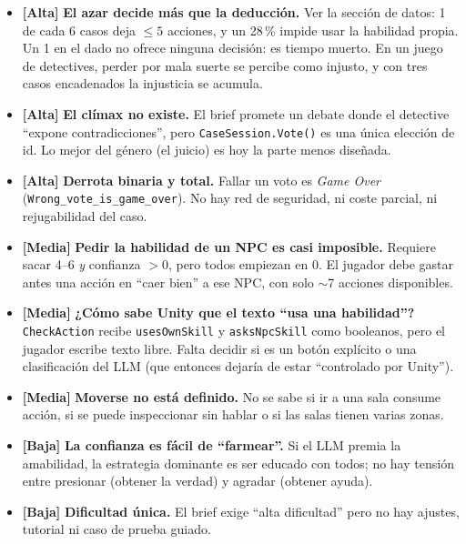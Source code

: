 \documentclass[11pt,a4paper]{article}
\newcommand{\file}[1]{\texttt{\small #1}}
\newcommand{\prio}[1]{\textbf{\color{neon}[#1]}}
\begin{document}
\begin{debil}
\begin{itemize}
\item \prio{Alta} \textbf{El azar decide más que la deducción.} Ver la sección de datos: 1 de cada 6
casos deja $\leq 5$ acciones, y un 28\,\% impide usar la habilidad propia. Un 1 en el dado no ofrece
ninguna decisión: es tiempo muerto. En un juego de detectives, perder por mala suerte se percibe como
injusto, y con tres casos encadenados la injusticia se acumula.
\item \prio{Alta} \textbf{El clímax no existe.} El brief promete un debate donde el detective
``expone contradicciones'', pero \file{CaseSession.Vote()} es una única elección de id. Lo mejor del
género (el juicio) es hoy la parte menos diseñada.
\item \prio{Alta} \textbf{Derrota binaria y total.} Fallar un voto es \emph{Game Over}
(\file{Wrong\_vote\_is\_game\_over}). No hay red de seguridad, ni coste parcial, ni rejugabilidad
del caso.
\item \prio{Media} \textbf{Pedir la habilidad de un NPC es casi imposible.} Requiere sacar 4--6
\emph{y} confianza $>0$, pero todos empiezan en 0. El jugador debe gastar antes una acción en
``caer bien'' a ese NPC, con solo $\sim$7 acciones disponibles.
\item \prio{Media} \textbf{¿Cómo sabe Unity que el texto ``usa una habilidad''?} \file{CheckAction}
recibe \texttt{usesOwnSkill} y \texttt{asksNpcSkill} como booleanos, pero el jugador escribe texto
libre. Falta decidir si es un botón explícito o una clasificación del LLM (que entonces dejaría de
estar ``controlado por Unity'').
\item \prio{Media} \textbf{Moverse no está definido.} No se sabe si ir a una sala consume acción,
si se puede inspeccionar sin hablar o si las salas tienen varias zonas.
\item \prio{Baja} \textbf{La confianza es fácil de ``farmear''.} Si el LLM premia la amabilidad, la
estrategia dominante es ser educado con todos; no hay tensión entre presionar (obtener la verdad) y
agradar (obtener ayuda).
\item \prio{Baja} \textbf{Dificultad única.} El brief exige ``alta dificultad'' pero no hay ajustes,
tutorial ni caso de prueba guiado.
\end{itemize}
\end{debil}
\end{document}
